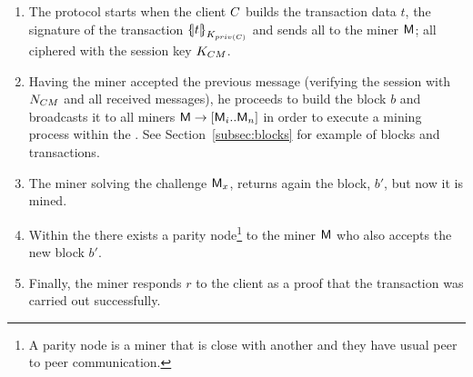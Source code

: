 \begin{enumerate}
    \item The protocol starts when the client $C$ builds the transaction 
        data $t$, the signature of the transaction $\fat{t}_{K_{priv(\client)}}$ and sends
        all to the miner $\textsf{M}$; all ciphered with the 
        session key $K_{CM}$. 
    \item Having the miner accepted the previous message (verifying the  
        session with $N_{CM}$ and all received messages), he proceeds to build 
        the block $b$ and broadcasts it to all miners $\textsf{M}\rightarrow [\textsf{M}_i .. \textsf{M}_n]$
        in order to execute a mining process within the \blockchaincarnetwork.
        See Section~\ref{subsec:blocks} for example of blocks and transactions.

        
    \item The miner solving the challenge $\textsf{M}_x$, returns again the block, $b'$, 
        but now it is mined. 
    \item Within the \blockchaincarnetwork there exists a parity node\footnote{
            A parity node is a miner that is close with another and they have usual
            peer to peer communication.
        } to the miner $\textsf{M}$
        who also accepts the new block $b'$.
    \item Finally, the miner responds $r$ to the client as a proof that the transaction 
        was carried out successfully.
\end{enumerate}



